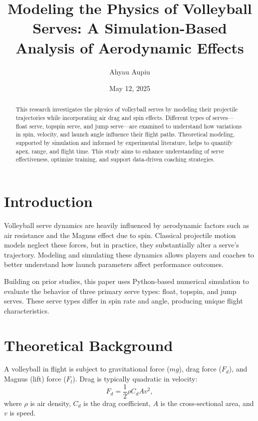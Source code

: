 \documentclass[11pt]{article}
\title{Modeling the Physics of Volleyball Serves: A Simulation-Based Analysis of Aerodynamic Effects}
\author{Ahyau Aupiu}
\date{May 12, 2025}
\begin{document}
\maketitle

\begin{abstract}
This research investigates the physics of volleyball serves by modeling their projectile trajectories while incorporating air drag and spin effects. Different types of serves—float serve, topspin serve, and jump serve—are examined to understand how variations in spin, velocity, and launch angle influence their flight paths. Theoretical modeling, supported by simulation and informed by experimental literature, helps to quantify apex, range, and flight time. This study aims to enhance understanding of serve effectiveness, optimize training, and support data-driven coaching strategies.
\end{abstract}

\section{Introduction}

Volleyball serve dynamics are heavily influenced by aerodynamic factors such as air resistance and the Magnus effect due to spin. Classical projectile motion models neglect these forces, but in practice, they substantially alter a serve’s trajectory. Modeling and simulating these dynamics allows players and coaches to better understand how launch parameters affect performance outcomes.

Building on prior studies\cite{armenti1992physics, mehta2001sports, watts1987curveball, cross2011float}, this paper uses Python-based numerical simulation to evaluate the behavior of three primary serve types: float, topspin, and jump serves. These serve types differ in spin rate and angle, producing unique flight characteristics.

\section{Theoretical Background}

A volleyball in flight is subject to gravitational force ($mg$), drag force ($F_d$), and Magnus (lift) force ($F_l$). Drag is typically quadratic in velocity:
\begin{equation}
F_d = \frac{1}{2} \rho C_d A v^2,
\end{equation}
where $\rho$ is air density, $C_d$ is the drag coefficient, $A$ is the cross-sectional area, and $v$ is speed.
\end{document}
